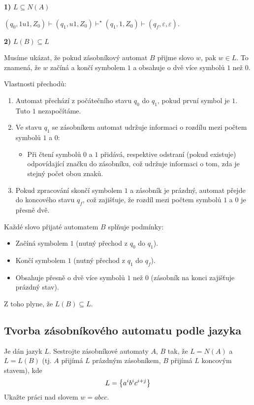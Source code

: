 \textbf{1)} $L \subseteq N(A)$

$(q_0, 1u1, Z_0) \vdash (q_1, u1, Z_0) \vdash^\star (q_1, 1, Z_0) \vdash (q_f, \varepsilon, \varepsilon)$.

\textbf{2)} $L(B) \subseteq L$

Musíme ukázat, že pokud zásobníkový automat $B$ přijme slovo $w$, pak $w \in L$. To znamená, že $w$ začíná a končí 
symbolem $1$ a obsahuje o dvě více symbolů $1$ než $0$.

Vlastnosti přechodů:
\begin{enumerate}[noitemsep]
    \item Automat přechází z počátečního stavu $q_0$ do $q_1$, pokud první symbol je $1$. Tuto $1$ nezapočítáme.
    \item Ve stavu $q_1$ se zásobníkem automat udržuje informaci o rozdílu mezi počtem symbolů $1$ a $0$:
    \begin{itemize}[noitemsep]
        \item Při čtení symbolů $0$ a $1$ přidává, respektive odstraní (pokud existuje) odpovídající značku do zásobníku,
        což udržuje informaci o tom, zda je stejný počet obou znaků.
    \end{itemize}
    \item Pokud zpracování skončí symbolem $1$ a zásobník je prázdný, automat přejde do koncového stavu $q_f$, což 
    zajišťuje, že rozdíl mezi počtem symbolů $1$ a $0$ je přesně dvě.
\end{enumerate}
Každé slovo přijaté automatem $B$ splňuje podmínky:
\begin{itemize}[noitemsep]
    \item Začíná symbolem $1$ (nutný přechod z $q_0$ do $q_1$).
    \item Končí symbolem $1$ (nutný přechod z $q_1$ do $q_f$).
    \item Obsahuje přesně o dvě více symbolů $1$ než $0$ (zásobník na konci zajišťuje prázdný stav).
\end{itemize}
Z toho plyne, že $L(B) \subseteq L$.

\subsection{Tvorba zásobníkového automatu podle jazyka}
Je dán jazyk $L$. Sestrojte zásobníkové automaty $A$, $B$ tak, že $L = N(A)$ a $L = L(B)$ (tj. $A$ přijímá $L$ prázdným 
zásobníkem, $B$ přijímá $L$ koncovým stavem), kde $$L = \left\lbrace a^i b^i c^{i+j} \right\rbrace$$
Ukažte práci nad slovem $w = abcc$. 

